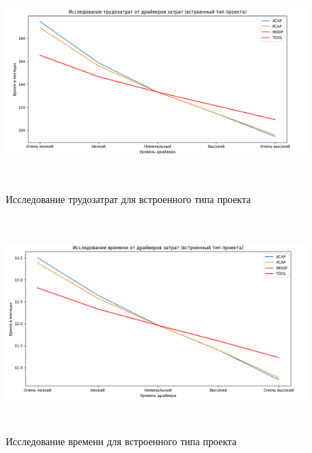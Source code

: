 \FloatBarrier
\begin{figure}[h]	
	\begin{center}
		\includegraphics[width=\linewidth, height=8cm]{inc/workhard.png}
	\end{center}
	\captionsetup{justification=centering}
	\caption{Исследование трудозатрат для встроенного типа проекта}
\end{figure}
\FloatBarrier 

\FloatBarrier
\begin{figure}[h]	
	\begin{center}
		\includegraphics[width=\linewidth, height=8cm]{inc/timehard.png}
	\end{center}
	\captionsetup{justification=centering}
	\caption{Исследование времени для встроенного типа проекта}
\end{figure}
\FloatBarrier 

